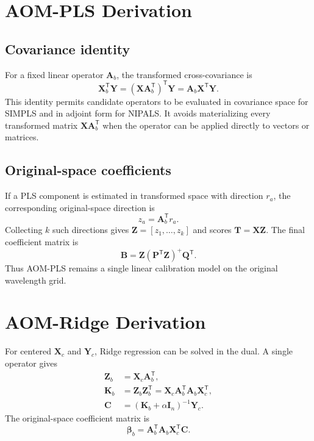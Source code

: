 \documentclass[11pt,a4paper]{article}
\newcommand{\X}{\mathbf{X}}
\newcommand{\Y}{\mathbf{Y}}
\newcommand{\A}{\mathbf{A}}
\newcommand{\K}{\mathbf{K}}
\newcommand{\B}{\mathbf{B}}
\newcommand{\Z}{\mathbf{Z}}
\newcommand{\transpose}{^{\mathsf T}}
\begin{document}
\section{AOM-PLS Derivation}

\subsection{Covariance identity}

For a fixed linear operator $\A_b$, the transformed cross-covariance is
\begin{equation}
  \X_b\transpose \Y =
  (\X\A_b\transpose)\transpose\Y =
  \A_b\X\transpose\Y .
  \label{eq:sup_cov_identity}
\end{equation}
This identity permits candidate operators to be evaluated in covariance space
for SIMPLS and in adjoint form for NIPALS.  It avoids materializing every
transformed matrix $\X\A_b\transpose$ when the operator can be applied directly
to vectors or matrices.

\subsection{Original-space coefficients}

If a PLS component is estimated in transformed space with direction $r_a$, the
corresponding original-space direction is
\begin{equation}
  z_a = \A_b\transpose r_a .
\end{equation}
Collecting $k$ such directions gives $\Z=[z_1,\ldots,z_k]$ and scores
$\mathbf T=\X\Z$.  The final coefficient matrix is
\begin{equation}
  \B = \Z(\mathbf P\transpose\Z)^+\mathbf Q\transpose .
\end{equation}
Thus AOM-PLS remains a single linear calibration model on the original
wavelength grid.

\section{AOM-Ridge Derivation}

For centered $\X_c$ and $\Y_c$, Ridge regression can be solved in the dual.  A
single operator gives
\begin{align}
  \mathbf Z_b &= \X_c\A_b\transpose,\\
  \K_b &= \mathbf Z_b\mathbf Z_b\transpose
       = \X_c\A_b\transpose\A_b\X_c\transpose,\\
  \mathbf C &= (\K_b + \alpha \mathbf I_n)^{-1}\Y_c.
\end{align}
The original-space coefficient matrix is
\begin{equation}
  \bm\beta_b = \A_b\transpose\A_b\X_c\transpose\mathbf C.
\end{equation}
\end{document}
